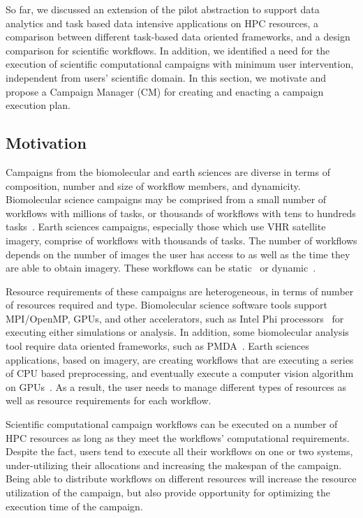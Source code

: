 \label{research}
So far, we discussed an extension of the pilot abstraction to support data analytics and task based data intensive applications on HPC resources, a comparison between different task-based data oriented frameworks, and a design comparison for scientific workflows.
In addition, we identified a need for the execution of scientific computational campaigns with minimum user intervention, independent from users' scientific domain.
In this section, we motivate and propose a Campaign Manager (CM) for creating and enacting a campaign execution plan.

\subsection{Motivation}
\label{subsec:motivation}
Campaigns from the biomolecular and earth sciences are diverse in terms of composition, number and size of workflow members, and dynamicity.
Biomolecular science campaigns may be comprised from a small number of workflows with millions of tasks, or thousands of workflows with tens to hundreds tasks~\cite{dakka2018high}. 
Earth sciences campaigns, especially those which use VHR satellite imagery, comprise of workflows with thousands of tasks.
The number of workflows depends on the number of images the user has access to as well as the time they are able to obtain imagery.
These workflows can be static~\cite{paraskevakos2019workflow} or dynamic~\cite{dakka2018high}.

Resource requirements of these campaigns are heterogeneous, in terms of number of resources required and type. 
Biomolecular science software tools support MPI/OpenMP, GPUs, and other accelerators, such as Intel Phi processors~\cite{cheatham2015impact} for executing either simulations or analysis.
In addition, some biomolecular analysis tool require data oriented frameworks, such as PMDA~\cite{fan2019pmda}.
Earth sciences applications, based on imagery, are creating workflows that are executing a series of CPU based preprocessing, and eventually execute a computer vision algorithm on GPUs~\cite{paraskevakos2019workflow}.
As a result, the user needs to manage different types of resources as well as resource requirements for each workflow.

Scientific computational campaign workflows can be executed on a number of HPC resources as long as they meet the workflows' computational requirements.
Despite the fact, users tend to execute all their workflows on one or two systems, under-utilizing their allocations and increasing the makespan of the campaign.
Being able to distribute workflows on different resources will increase the resource utilization of the campaign, but also provide opportunity for optimizing the execution time of the campaign.

